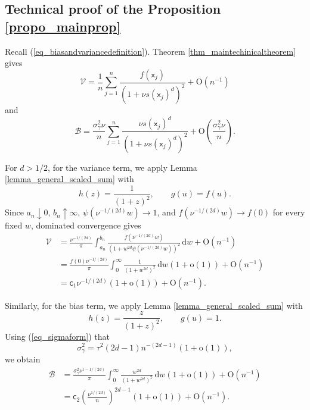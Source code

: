 \documentclass[11pt]{article}
\newcommand{\OO}{\mathrm{O}}
\newcommand{\sfx}{\mathsf{x}}
\numberwithin{equation}{section}
\numberwithin{figure}{section}
\begin{document}
\subsection{Technical proof of the Proposition \ref{propo_mainprop}}

Recall (\ref{eq_biasandvariancedefinition}). 
Theorem \ref{thm_maintechinicaltheorem} gives
\[
\mathcal{V}=\frac{1}{n}\sum_{j=1}^n
\frac{f(\sfx_j)}{(1+\nu s(\sfx_j)^d)^2}+\OO(n^{-1})
\]
and
\[
\mathcal{B}=\frac{\sigma_\gamma^2\nu}{n}
\sum_{j=1}^n
\frac{\nu s(\sfx_j)^d}{(1+\nu s(\sfx_j)^d)^2}
+\OO\left(\frac{\sigma_\gamma^2\nu}{n}\right).
\]

For \(d>1/2\), for the variance term, we apply Lemma \ref{lemma_general_scaled_sum}  with
\begin{equation}\label{eq_lemmaa2variancefunction}
h(z)=\frac{1}{(1+z)^2},
\qquad
g(u)=f(u).
\end{equation}
Since \(a_n\downarrow 0\), \(b_n\uparrow\infty\),
\(\psi(\nu^{-1/(2d)}w)\to1\), and
\(f(\nu^{-1/(2d)}w)\to f(0)\) for every fixed \(w\), dominated
convergence gives
\begin{equation*}
\begin{aligned}
\mathcal{V}
&=
\frac{\nu^{-1/(2d)}}{\pi}
\int_{a_n}^{b_n}
\frac{f(\nu^{-1/(2d)}w)}
{(1+w^{2d}\psi(\nu^{-1/(2d)}w))^2}
\,\mathrm{d}w
+\mathrm{O}(n^{-1}) \\
&=
\frac{f(0)\nu^{-1/(2d)}}{\pi}
\int_0^\infty\frac{1}{(1+w^{2d})^2}\,\mathrm{d}w
(1+\mathrm{o}(1))+\mathrm{O}(n^{-1}) \\
&=
\mathsf{c}_1\nu^{-1/(2d)}
(1+\mathrm{o}(1))+\mathrm{O}(n^{-1}).
\end{aligned}
\end{equation*}

Similarly, for the bias term, we apply Lemma \ref{lemma_general_scaled_sum} with
\begin{equation}\label{eq_lemma2functionsbias}
h(z)=\frac{z}{(1+z)^2},
\qquad
g(u)=1.
\end{equation}
Using (\ref{eq_sigmaform}) that
\begin{equation*}
\sigma_\gamma^2
=
\tau^2(2d-1)n^{-(2d-1)}
(1+\mathrm{o}(1)),
\end{equation*}
we obtain
\begin{equation*}
\begin{aligned}
\mathcal{B}
&=
\frac{\sigma_\gamma^2\nu^{1-1/(2d)}}{\pi}
\int_0^\infty
\frac{w^{2d}}{(1+w^{2d})^2}\,\mathrm{d}w
(1+\mathrm{o}(1))+\mathrm{O}(n^{-1}) \\
&=
\mathsf{c}_2
\left(\frac{\nu^{1/(2d)}}{n}\right)^{2d-1}
(1+\mathrm{o}(1))+\mathrm{O}(n^{-1}).
\end{aligned}
\end{equation*}
\end{document}
